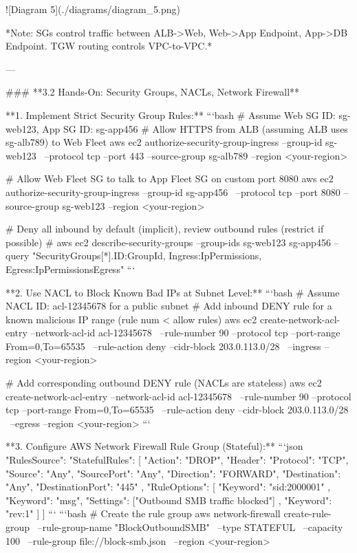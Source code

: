 \documentclass{article}
\begin{document}
![Diagram 5](./diagrams/diagram_5.png)


*Note: SGs control traffic between ALB->Web, Web->App Endpoint, App->DB Endpoint. TGW routing controls VPC-to-VPC.*

---

### **3.2 Hands-On: Security Groups, NACLs, Network Firewall**

**1. Implement Strict Security Group Rules:**
```bash
# Assume Web SG ID: sg-web123, App SG ID: sg-app456
# Allow HTTPS from ALB (assuming ALB uses sg-alb789) to Web Fleet
aws ec2 authorize-security-group-ingress --group-id sg-web123 \
  --protocol tcp --port 443 --source-group sg-alb789 --region <your-region>

# Allow Web Fleet SG to talk to App Fleet SG on custom port 8080
aws ec2 authorize-security-group-ingress --group-id sg-app456 \
  --protocol tcp --port 8080 --source-group sg-web123 --region <your-region>

# Deny all inbound by default (implicit), review outbound rules (restrict if possible)
# aws ec2 describe-security-groups --group-ids sg-web123 sg-app456 --query "SecurityGroups[*].{ID:GroupId, Ingress:IpPermissions, Egress:IpPermissionsEgress}"
```

**2. Use NACL to Block Known Bad IPs at Subnet Level:**
```bash
# Assume NACL ID: acl-12345678 for a public subnet
# Add inbound DENY rule for a known malicious IP range (rule num < allow rules)
aws ec2 create-network-acl-entry --network-acl-id acl-12345678 \
  --rule-number 90 --protocol tcp --port-range From=0,To=65535 \
  --rule-action deny --cidr-block 203.0.113.0/28 \
  --ingress --region <your-region>

# Add corresponding outbound DENY rule (NACLs are stateless)
aws ec2 create-network-acl-entry --network-acl-id acl-12345678 \
  --rule-number 90 --protocol tcp --port-range From=0,To=65535 \
  --rule-action deny --cidr-block 203.0.113.0/28 \
  --egress --region <your-region>
```

**3. Configure AWS Network Firewall Rule Group (Stateful):**
```json
{
  "RulesSource": {
    "StatefulRules": [
      {
        "Action": "DROP",
        "Header": {
          "Protocol": "TCP",
          "Source": "Any",
          "SourcePort": "Any",
          "Direction": "FORWARD",
          "Destination": "Any",
          "DestinationPort": "445" 
        },
        "RuleOptions": [
          { "Keyword": "sid:2000001" },
          { "Keyword": "msg", "Settings": ["Outbound SMB traffic blocked"] },
          { "Keyword": "rev:1" }
        ]
      }
    ]
  }
}
```
```bash
# Create the rule group
aws network-firewall create-rule-group \
    --rule-group-name "BlockOutboundSMB" \
    --type STATEFUL \
    --capacity 100 \
    --rule-group file://block-smb.json \
    --region <your-region>
\end{document}
